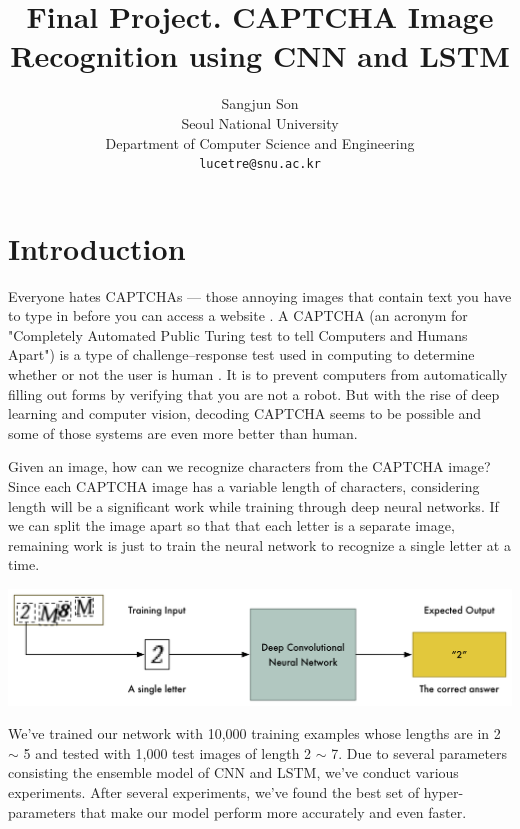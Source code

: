 \documentclass[10pt,letterpaper]{article}
\begin{document}
\title{Final Project. CAPTCHA Image Recognition using CNN and LSTM}

\author{Sangjun Son\\
Seoul National University\\
Department of Computer Science and Engineering\\
{\tt\small lucetre@snu.ac.kr}
}

\maketitle

\section{Introduction}


Everyone hates CAPTCHAs — those annoying images that contain text you have to type in before you can access a website \cite{captcha}. A CAPTCHA (an acronym for "Completely Automated Public Turing test to tell Computers and Humans Apart") is a type of challenge–response test used in computing to determine whether or not the user is human \cite{recaptcha}. It is to prevent computers from automatically filling out forms by verifying that you are not a robot. But with the rise of deep learning and computer vision, decoding CAPTCHA seems to be possible and some of those systems are even more better than human.

Given an image, how can we recognize characters from the CAPTCHA image? Since each CAPTCHA image has a variable length of characters, considering length will be a significant work while training through deep neural networks. If we can split the image apart so that that each letter is a separate image, remaining work is just to train the neural network to recognize a single letter at a time\cite{captcha}.

\begin{center}
\includegraphics[width=1\linewidth]{./overview.png}
\end{center}

We've trained our network with 10,000 training examples whose lengths are in 2 $\sim$ 5 and tested with 1,000 test images of length 2 $\sim$ 7. Due to several parameters consisting the ensemble model of CNN and LSTM, we've conduct various experiments. After several experiments, we've found the best set of hyper-parameters that make our model perform more accurately and even faster.
\end{document}
